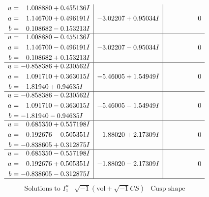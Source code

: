 \documentclass[1p]{elsarticle_modified}
\theoremstyle{definition}
\newcommand{\I}{\sqrt{-1}}
\begin{document}
$$\begin{array}{c|c|c}
\begin{aligned}
u &= \phantom{-}1.008880 + 0.455136 I \\
a &= \phantom{-}1.146700 + 0.496191 I \\
b &= \phantom{-}0.108682 - 0.153213 I\end{aligned}
 & -3.02207 + 0.95034 I & \phantom{-0.000000 } 0 \\ \hline\begin{aligned}
u &= \phantom{-}1.008880 - 0.455136 I \\
a &= \phantom{-}1.146700 - 0.496191 I \\
b &= \phantom{-}0.108682 + 0.153213 I\end{aligned}
 & -3.02207 - 0.95034 I & \phantom{-0.000000 } 0 \\ \hline\begin{aligned}
u &= -0.858386 + 0.230562 I \\
a &= \phantom{-}1.091710 + 0.363015 I \\
b &= -1.81940 + 0.94635 I\end{aligned}
 & -5.46005 + 1.54949 I & \phantom{-0.000000 } 0 \\ \hline\begin{aligned}
u &= -0.858386 - 0.230562 I \\
a &= \phantom{-}1.091710 - 0.363015 I \\
b &= -1.81940 - 0.94635 I\end{aligned}
 & -5.46005 - 1.54949 I & \phantom{-0.000000 } 0 \\ \hline\begin{aligned}
u &= \phantom{-}0.685350 + 0.557198 I \\
a &= \phantom{-}0.192676 - 0.505351 I \\
b &= -0.838605 + 0.312875 I\end{aligned}
 & -1.88020 + 2.17309 I & \phantom{-0.000000 } 0 \\ \hline\begin{aligned}
u &= \phantom{-}0.685350 - 0.557198 I \\
a &= \phantom{-}0.192676 + 0.505351 I \\
b &= -0.838605 - 0.312875 I\end{aligned}
 & -1.88020 - 2.17309 I & \phantom{-0.000000 } 0\\
 \hline 
 \end{array}$$\newpage$$\begin{array}{c|c|c}  
\text{Solutions to }I^u_{1}& \I (\text{vol} + \sqrt{-1}CS) & \text{Cusp shape}\\
 \hline 
\begin{aligned}

\end{aligned}
\end{array}$$
\end{document}
